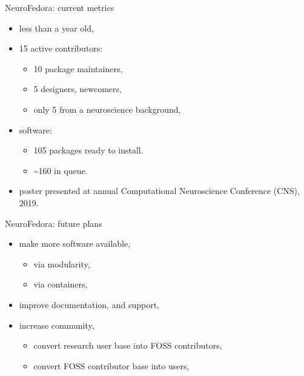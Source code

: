 \begin{frame}[c]{NeuroFedora: current metrics}
  \begin{itemize}
    \item \alert{less than a year old\footnotemark[8],}
      \pause{}
    \item \textcolor{FirstGreen}{15 active contributors:}
      \begin{itemize}
        \item 10 package maintainers,
        \item 5 designers, newcomers,
        \item only 5 from a neuroscience background,
      \end{itemize}
      \pause{}
    \item \textcolor{FriendsMagenta}{software:}
      \begin{itemize}
        \item 105 packages ready to install\footnotemark[9].
        \item \textasciitilde{}160 in queue\footnotemark[10].
      \end{itemize}
      \pause{}
    \item \textcolor{FedoraBlue}{poster presented at annual Computational Neuroscience Conference (CNS), 2019\footnotemark[11].}
  \end{itemize}
\end{frame}
\begin{frame}[c]{NeuroFedora: future plans}
  \begin{itemize}
    \item \alert{make more software available,}
      \begin{itemize}
        \item \alert{via modularity,}
        \item \alert{via containers,}
      \end{itemize}
      \pause{}
    \item \textcolor{FirstGreen}{improve documentation, and support,}
      \pause{}
    \item \textcolor{FriendsMagenta}{increase community,}
      \begin{itemize}
        \item \textcolor{FriendsMagenta}{convert research user base into FOSS contributors,}
        \item \textcolor{FriendsMagenta}{convert FOSS contributor base into users,}
      \end{itemize}
  \end{itemize}
\end{frame}
